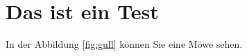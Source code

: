 \chapter{Das ist ein Test}

In der Abbildung \ref{fig:gull} können Sie eine Möwe sehen.




\Blinddocument

\Blinddocument
